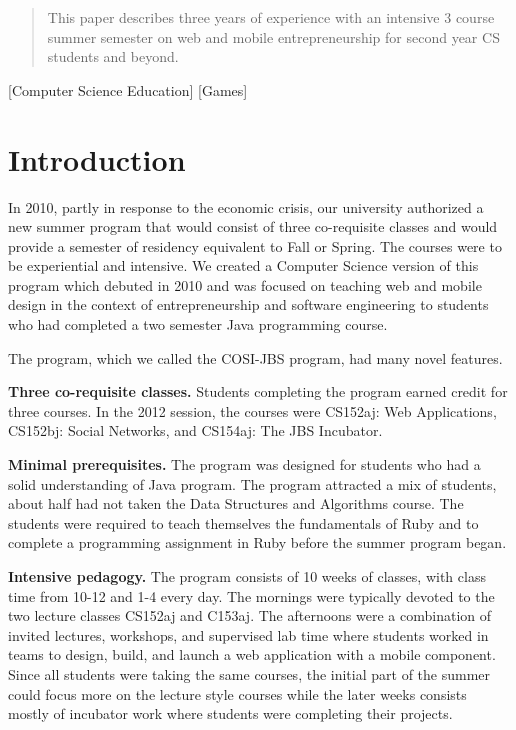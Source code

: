 \documentclass{sig-alternate}
\begin{document}
\maketitle
\begin{abstract}
This paper describes three years of experience with an
intensive 3 course summer semester on web and mobile entrepreneurship for second year CS students and beyond.
\end{abstract}

[Computer Science Education]
[Games]



\section{Introduction}
In 2010, partly in response to the economic crisis, our university authorized a new summer program that would consist of three co-requisite classes and would provide a semester of residency equivalent to Fall or Spring.  The courses were to be experiential and intensive. We created a Computer Science version of this program which debuted in 2010 and was focused on teaching web and mobile design in the context of entrepreneurship and software engineering to students who had completed a two semester Java programming course.

The program, which we called the COSI-JBS program, had many novel features.

{\bf Three co-requisite classes.} Students completing the program earned credit for three courses. In the 2012 session, the courses were CS152aj: Web Applications, CS152bj: Social Networks, and CS154aj: The JBS Incubator. 

{\bf Minimal prerequisites.} The program was designed for students who had a solid understanding of Java program. The program attracted a mix of students, about half had not taken the Data Structures and Algorithms course. The students were required to teach themselves the fundamentals of Ruby and to complete a programming assignment in Ruby before the summer program began.

{\bf Intensive pedagogy.} The program consists of 10 weeks of classes, with class time from 10-12 and 1-4 every day. The mornings were typically devoted to the two lecture classes CS152aj and C153aj. The afternoons were a combination of invited lectures, workshops, and supervised lab time where students worked in teams to design, build, and launch a web application with a mobile component. Since all students were taking the same courses, the initial part of the summer could focus more on the lecture style courses while the later weeks consists mostly of incubator work where students were completing their projects.
\end{document}
